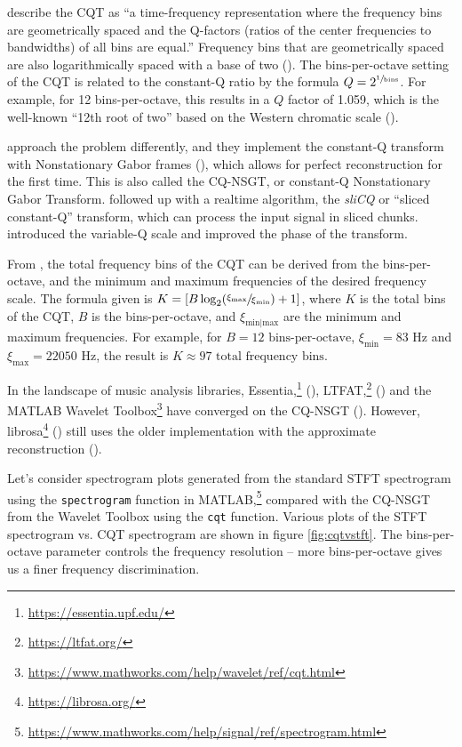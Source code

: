 \documentclass[report.tex]{subfiles}
\begin{document}
\textcite{klapuricqt} describe the CQT as ``a time-frequency representation where the frequency bins are geometrically spaced and the Q-factors (ratios of the center frequencies to bandwidths) of all bins are equal.'' Frequency bins that are geometrically spaced are also logarithmically spaced with a base of two (\cite{geometriclog}). The bins-per-octave setting of the CQT is related to the constant-Q ratio by the formula $Q = 2^{\sfrac{1}{\text{bins}}}$. For example, for 12 bins-per-octave, this results in a $Q$ factor of 1.059, which is the well-known ``12th root of two'' based on the Western chromatic scale (\cite{westernpitch1, westernpitch2}).

\textcite{invertiblecqt} approach the problem differently, and they implement the constant-Q transform with Nonstationary Gabor frames (\cite{balazs}), which allows for perfect reconstruction for the first time. This is also called the CQ-NSGT, or constant-Q Nonstationary Gabor Transform. \textcite{slicq} followed up with a realtime algorithm, the \textit{sliCQ} or ``sliced constant-Q'' transform, which can process the input signal in sliced chunks. \textcite{variableq1} introduced the variable-Q scale and improved the phase of the transform.

From \textcite{invertiblecqt}, the total frequency bins of the CQT can be derived from the bins-per-octave, and the minimum and maximum frequencies of the desired frequency scale. The formula given is $K = [B \log_{2}(\sfrac{\xi_{\text{max}}}{\xi_{\text{min}}}) + 1]$, where $K$ is the total bins of the CQT, $B$ is the bins-per-octave, and $\xi_{\text{min|max}}$ are the minimum and maximum frequencies. For example, for $B = 12 \text{ bins-per-octave}$, $\xi_{\text{min}} = 83 \text{ Hz}$ and $\xi_{\text{max}} = 22050 \text{ Hz}$, the result is $K \approx 97 \text{ total frequency bins}$.

In the landscape of music analysis libraries, Essentia,\footnote{\url{https://essentia.upf.edu/}} (\cite{essentia}), LTFAT,\footnote{\url{https://ltfat.org/}} (\cite{ltfat}) and the MATLAB Wavelet Toolbox\footnote{\url{https://www.mathworks.com/help/wavelet/ref/cqt.html}} have converged on the CQ-NSGT (\cite{invertiblecqt, slicq, variableq1}). However, librosa\footnote{\url{https://librosa.org/}} (\cite{librosa}) still uses the older implementation with the approximate reconstruction (\cite{klapuricqt}).

Let's consider spectrogram plots generated from the standard STFT spectrogram using the \Verb#spectrogram# function in MATLAB,\footnote{\url{https://www.mathworks.com/help/signal/ref/spectrogram.html}} compared with the CQ-NSGT from the Wavelet Toolbox using the \Verb#cqt# function. Various plots of the STFT spectrogram vs. CQT spectrogram are shown in figure \ref{fig:cqtvstft}. The bins-per-octave parameter controls the frequency resolution -- more bins-per-octave gives us a finer frequency discrimination.
\end{document}
